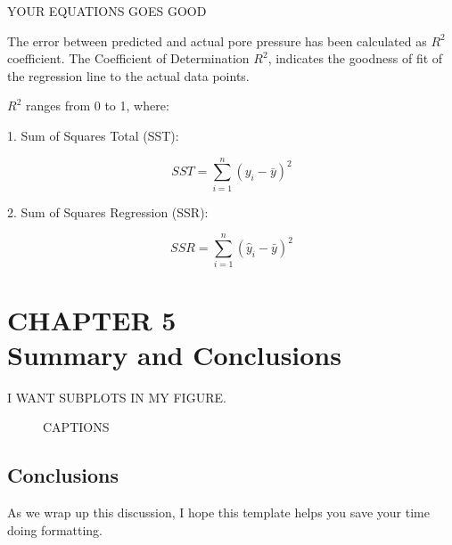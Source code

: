 \documentclass[12pt]{article}
\begin{document}
YOUR EQUATIONS GOES GOOD

The error between predicted and actual pore pressure has been calculated as \( R^2 \) coefficient. The Coefficient of Determination  \( R^2 \), indicates the goodness of fit of the regression line to the actual data points.

 \( R^2 \) ranges from 0 to 1, where:
 

1. Sum of Squares Total (SST):

   \[ SST = \sum_{i=1}^{n} (y_i - \bar{y})^2 \]

2. Sum of Squares Regression (SSR):

   \[ SSR = \sum_{i=1}^{n} (\hat{y}_i - \bar{y})^2 \]

\newpage
\section*{CHAPTER 5\\Summary and Conclusions}

I WANT SUBPLOTS IN MY FIGURE. 

\begin{figure}[H]
    \centering
    \hfill
    \caption{CAPTIONS}
    \label{fig:two_plots}
\end{figure}


\newpage
\subsection*{Conclusions}
As we wrap up this discussion, I hope this template helps you save your time doing formatting.


\newpage


\end{document}
